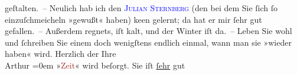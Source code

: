                geſtalten. – Neulich hab ich den \textcolor{blue}{\textsc{Julian Sternberg}}{}\ledrightnote{\textcolor{blue}{Julian Sternberg}} (den bei dem Sie ſich ſo einzuſchmeicheln »gewußt« haben) ke{\geminationn}en gelernt; da hat er mir ſehr gut gefallen. –\pend
           \pstart
           {\pb}Außerdem regnets, iſt kalt, und der Winter iſt
               da. –\pend
           \pstart
           Leben Sie wohl und ſchreiben Sie einem doch wenigſtens endlich einmal, wann man sie
               »wieder haben« wird.\pend
           \pstart
           Herzlich der Ihre{\\[\baselineskip]}\spacefill\mbox{Arthur}\pend
           \leftskip=0em{}\pstart
           \noindent{}»\textcolor{brown}{Zeit}{}\ledrightnote{\textcolor{brown}{Die Zeit. Wiener Wochenschrift}}« wird beſorgt. Sie iſt \uline{ſehr} gut\pend
           \endnumbering{}  
      